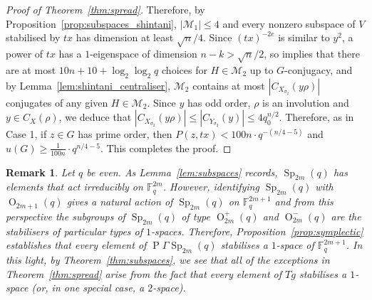 \documentclass[11pt]{article}
\numberwithin{equation}{section}
\theoremstyle{shdefinition}
\newtheorem{remark}[definition]{Remark}
\theoremstyle{shplain}
\newcommand{\s}{\sigma}
\newcommand{\M}{\mathcal{M}}
\newcommand{\<}{\langle}
\renewcommand{\>}{\rangle}
\renewcommand{\leq}{\leqslant}
\renewcommand{\geq}{\geqslant}
\newcommand{\F}{\mathbb{F}}
\renewcommand{\:}{\colon}
\newcommand{\Sp}{\operatorname{Sp}}
\newcommand{\PGaSp}{\operatorname{P}\!\Gamma\!\operatorname{Sp}}
\renewcommand{\O}{\operatorname{O}}
\begin{document}
\begin{proof}[Proof of Theorem~\ref{thm:spread}]
Therefore, by Proposition~\ref{prop:subspaces_shintani}, $|\M_1| \leq 4$ and every nonzero subspace of $V$ stabilised by $tx$ has dimension at least $\sqrt{n}/4$. Since $(tx)^{-2e}$ is similar to $y^2$, a power of $tx$ has a $1$-eigenspace of dimension $n-k > \sqrt{n}/2$, so \cite[Theorem~7.1]{ref:GuralnickSaxl03} implies that there are at most $10n+10+\log_2\log_2{q}$ choices for $H \in \M_2$ up to $G$-conjugacy, and by Lemma~\ref{lem:shintani_centraliser}, $\M_2$ contains at most $|C_{X_{\s_2}}(y\rho)|$ conjugates of any given $H \in \M_2$. Since $y$ has odd order, $\rho$ is an involution and $y \in C_X(\rho)$, we deduce that $|C_{X_{\s_2}}(y\rho)| \leq |C_{Y_{\s_2}}(y)| \leq 4q_0^{n/2}$. Therefore, as in Case 1, if $z \in G$ has prime order, then $P(z,tx) < 100n \cdot q^{-(n/4-5)}$ and $u(G) \geq \frac{1}{100n} \cdot q^{n/4-5}$. This completes the proof.
\end{proof}

\begin{remark} \label{rem:spread_symplectic}
Let $q$ be even. As Lemma~\ref{lem:subspaces} records, $\Sp_{2m}(q)$ has elements that act irreducibly on $\F_q^{2m}$. However, identifying $\Sp_{2m}(q)$ with $\O_{2m+1}(q)$ gives a natural action of $\Sp_{2m}(q)$ on $\F_q^{2m+1}$ and from this perspective the subgroups of $\Sp_{2m}(q)$ of type $\O^+_{2m}(q)$ and $\O^-_{2m}(q)$ are the stabilisers of particular types of $1$-spaces. Therefore, Proposition~\ref{prop:symplectic} establishes that every element of $\PGaSp_{2m}(q)$ stabilises a $1$-space of $\F_q^{2m+1}$. In this light, by Theorem~\ref{thm:subspaces}, we see that all of the exceptions in Theorem~\ref{thm:spread} arise from the fact that every element of $Tg$ stabilises a $1$-space (or, in one special case, a $2$-space).
\end{remark}
\end{document}
